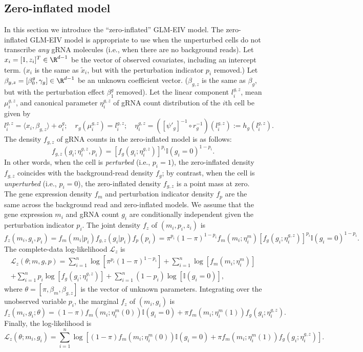 \documentclass[11pt]{article}
\begin{document}
\begin{appendices}
\begin{refsection}
\section{Zero-inflated model}\label{sec:zero_inf_model}
In this section we introduce the ``zero-inflated'' GLM-EIV model. The zero-inflated GLM-EIV model is appropriate to use when the unperturbed cells do not transcribe \textit{any} gRNA molecules (i.e., when there are no background reads). Let $x_i = [1, z_i]^T \in \R^{d-1}$ be the vector of observed covariates, including an intercept term. ($x_i$ is the same as $\tilde{x}_i$, but with the perturbation indicator $p_i$ removed.) Let $\beta_{g,z} = [\beta^g_0, \gamma_g] \in \R^{d-1}$ be an unknown coefficient vector. ($\beta_{g,z}$ is the same as $\beta_g$, but with the perturbation effect $\beta^g_1$ removed). Let the linear component $l^{g,z}_i$, mean $\mu^{g,z}_i$, and canonical parameter $\eta^{g,z}_i$ of gRNA count distribution of the $i$th cell be given by
$$
l^{g,z}_i = \langle x_i, \beta_{g,z} \rangle + o^g_i; \quad
r_g(\mu^{g,z}_i) = l^{g,z}_i; \quad
\eta^{g,z}_i = ([\psi'_g]^{-1} \circ r^{-1}_g)(l^{g,z}_i) := h_g(l^{g,z}_i).
$$
The density $f_{g,z}$ of gRNA counts in the zero-inflated model is as follows:
$$f_{g,z}(g_i; \eta^{g,z}_i, p_i) = [f_g(g_i;\eta^{g,z}_i)]^{p_i} \mathbb{I}(g_i = 0)^{1-p_i}.$$
In other words, when the cell is \textit{perturbed} (i.e., $p_i = 1$), the zero-inflated density $f_{g,z}$ coincides with the background-read density $f_g$; by contrast, when the cell is \textit{unperturbed} (i.e., $p_i = 0$), the zero-inflated density $f_{g,z}$ is a point mass at zero. The gene expression density $f_m$ and perturbation indicator density $f_p$ are the same across the background read and zero-inflated models. We assume that the gene expression $m_i$ and gRNA count $g_i$ are conditionally independent given the perturbation indicator $p_i$. The joint density $f_z$ of $(m_i, p_i, z_i)$ is
\begin{equation*}
f_z(m_i, g_i, p_i) = f_m(m_i | p_i) f_{g,z}(g_i | p_i) f_p(p_i) = \pi^{p_i} (1-\pi)^{1-p_i} f_m(m_i; \eta^m_i)[f_g(g_i; \eta_i^{g,z})]^{p_i} \mathbb{I}(g_i = 0)^{1-p_i}.
\end{equation*}
The complete-data log-likelihood $\mathcal{L}_z$ is
\begin{multline*}
\mathcal{L}_z(\theta; m, g, p) = \sum_{i=1}^n \log \left[ \pi^{p_i} (1-\pi)^{1-p_i} \right] + \sum_{i=1}^n \log\left[f_m(m_i; \eta^m_i) \right] \\ + \sum_{i=1}^n p_i \log \left[f_{g}(g_i; \eta_i^{g,z}) \right] + \sum_{i=1}^n (1 - p_i)\log\left[ \mathbb{I}(g_i = 0) \right],
\end{multline*}
where $\theta = [\pi, \beta_m, \beta_{g,z}]$ is the vector of unknown parameters.
Integrating over the unobserved variable $p_i$, the marginal $f_z$ of $(m_i, g_i)$ is
$$f_z(m_i, g_i; \theta) = (1-\pi) f_m(m_i;\eta^m_i(0)) \mathbb{I}(g_i = 0) + \pi f_m(m_i; \eta^m_i(1)) f_g(g_i;\eta^{g,z}_i).$$ Finally, the log-likelihood is
$$
\mathcal{L}_z(\theta; m_i, g_i) = \sum_{i=1}^n \log\left[ (1-\pi) f_m(m_i;\eta^m_i(0)) \mathbb{I}(g_i = 0) + \pi f_m(m_i; \eta^m_i(1)) f_g(g_i;\eta^{g,z}_i) \right].
$$


\end{refsection}
\end{appendices}
\end{document}
